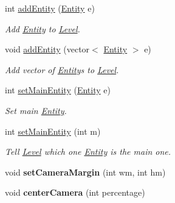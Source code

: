 \begin{DoxyCompactItemize}
\mbox{\label{classLevel_a9345e51c6abbc422864bf6954c5f6312}} 
int \hyperlink{classLevel_a9345e51c6abbc422864bf6954c5f6312}{add\+Entity} (\hyperlink{classEntity}{Entity} e)
\begin{DoxyCompactList}\small\item\em Add \hyperlink{classEntity}{Entity} to \hyperlink{classLevel}{Level}. \end{DoxyCompactList}\item 
\mbox{\label{classLevel_a6c4584d5aa383888461406de600a43c1}} 
void \hyperlink{classLevel_a6c4584d5aa383888461406de600a43c1}{add\+Entity} (vector$<$ \hyperlink{classEntity}{Entity} $>$ e)
\begin{DoxyCompactList}\small\item\em Add vector of \hyperlink{classEntity}{Entity}\textquotesingle{}s to \hyperlink{classLevel}{Level}. \end{DoxyCompactList}\item 
\mbox{\label{classLevel_afc8426f1adb6037dd71b26e4bd63db92}} 
int \hyperlink{classLevel_afc8426f1adb6037dd71b26e4bd63db92}{set\+Main\+Entity} (\hyperlink{classEntity}{Entity} e)
\begin{DoxyCompactList}\small\item\em Set main \hyperlink{classEntity}{Entity}. \end{DoxyCompactList}\item 
\mbox{\label{classLevel_ab7cf0af8d8c89da5a2dc9d3e3b978637}} 
int \hyperlink{classLevel_ab7cf0af8d8c89da5a2dc9d3e3b978637}{set\+Main\+Entity} (int m)
\begin{DoxyCompactList}\small\item\em Tell \hyperlink{classLevel}{Level} which one \hyperlink{classEntity}{Entity} is the main one. \end{DoxyCompactList}\item 
\mbox{\label{classLevel_a69a4cae59576b540090202ab3c22e8d5}} 
void {\bfseries set\+Camera\+Margin} (int wm, int hm)
\item 
\mbox{\label{classLevel_ae2df583cad2a4bbda86e4043d4b81a70}} 
void {\bfseries center\+Camera} (int percentage)
\item 
\mbox{\label{classLevel_a72667cfc3b4e98433f4faac78e30e83e}} 

\end{DoxyCompactItemize}
